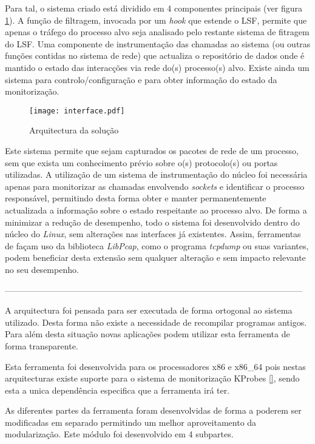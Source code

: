 Para tal, o sistema criado está dividido em 4 componentes principais (ver figura \ref{arquitectura}). A função de filtragem, invocada por um \textit{hook} que estende o LSF, permite que apenas o tráfego do processo alvo seja analisado pelo restante sistema de fitragem do LSF. Uma componente de instrumentação das chamadas ao sistema (ou outras funções contidas no sistema de rede) que actualiza o repositório de dados onde é mantido o estado das interacções via rede do(s) processo(s) alvo. Existe ainda um sistema para controlo/configuração e para obter informação do estado da monitorização.

\begin{figure}[htbp]
\begin{center}
\texttt{[image: interface.pdf]} 
\caption{Arquitectura da solução}
\label{arquitectura}
\end{center}
\end{figure}


Este sistema permite que sejam capturados os pacotes de rede de um processo, sem que exista um conhecimento prévio sobre o(s) protocolo(s) ou portas utilizadas. A utilização de um sistema de instrumentação do núcleo foi necessária apenas para monitorizar as chamadas envolvendo \emph{sockets} e identificar o processo responsável, permitindo desta forma obter e manter permanentemente actualizada a informação sobre o estado respeitante ao processo alvo. De forma a minimizar a redução de desempenho, todo o sistema foi desenvolvido dentro do núcleo do \textit{Linux}, sem alterações nas interfaces já existentes.  Assim, ferramentas de façam uso da biblioteca \textit{LibPcap}, como o programa \textit{tcpdump} ou suas variantes, podem beneficiar desta extensão sem qualquer alteração e sem impacto relevante no seu desempenho.

---------------------------------------------------------------------------------------------------------

A arquitectura foi pensada para ser executada de forma ortogonal ao sistema
utilizado. Desta forma não existe a necessidade de recompilar programas
antigos. Para além desta situação novas aplicações podem utilizar esta
ferramenta de forma transparente.

Esta ferramenta foi desenvolvida para os processadores x86 e x86\_64 pois nestas
arquitecturas existe suporte para o sistema de monitorização KProbes \ref{},
sendo esta a unica dependência especifica que a ferramenta irá ter.

As diferentes partes da ferramenta foram desenvolvidas de forma a poderem ser
modificadas em separado permitindo um melhor aproveitamento da modularização.
Este módulo foi desenvolvido em 4 subpartes. 

